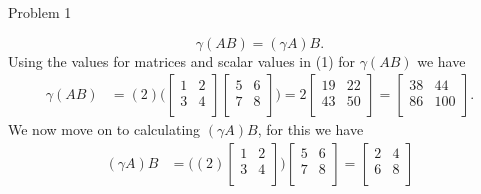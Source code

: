 \begin{problem}{Problem 1}
\begin{Highlight}[Solution]
        \begin{equation}
            \gamma (AB) = (\gamma A)B.
        \end{equation}
        Using the values for matrices and scalar values in (1) for $\gamma (AB)$ we have
        \begin{align*}
            \gamma (AB) & = (2)
            \Bigg(
                \begin{bmatrix}
                    1 & 2 \\
                    3 & 4 \\
                \end{bmatrix}
                \begin{bmatrix}
                    5 & 6 \\
                    7 & 8 \\
                \end{bmatrix}
            \Bigg)
            = 2 
            \begin{bmatrix}
                19 & 22 \\
                43 & 50 \\
            \end{bmatrix}
            = 
            \begin{bmatrix}
                38 & 44 \\
                86 & 100 \\
            \end{bmatrix}.
        \end{align*}
        We now move on to calculating $(\gamma A)B$, for this we have
        \begin{align*}
            (\gamma A)B & = 
            \Bigg(
                (2)
                \begin{bmatrix}
                    1 & 2 \\
                    3 & 4 \\
                \end{bmatrix}
            \Bigg)
            \begin{bmatrix}
                5 & 6 \\
                7 & 8 \\
            \end{bmatrix}
            = 
            \begin{bmatrix}
                2 & 4 \\
                6 & 8 \\
            \end{bmatrix}

\end{align*}
\end{Highlight}
\end{problem}
